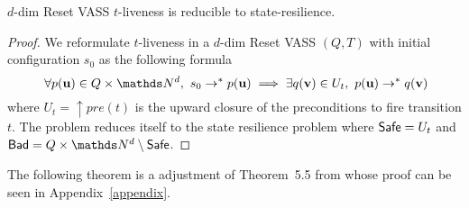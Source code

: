 \iffalse
\alain{ou alors $t=(u,u')$ such that $u \rightarrow u'$ mais alors c'est bizarre de nommer par la même lettre $t$ des couples différents $(u,u'), (v,v'),...$ dans un WSTS...ou alors on appelle transition un couple $(u,u')$ such that $u \rightarrow u'$ mais plus de lettre $t$...ou on définit un WSTS par un nombre fini de (shéma de ) transition $t_i$ qui sont compatibles par compatibilité mais ça contraint à un nombre fini (comme dans les VASS) ou alors on ne parle ici que des VASS et pas des WSTS mais ça suffira puisque state resilience pour VASS implique pour WSTS BREF il faut réfléchir à ce qu'est une transition...}

\mathieu{En train de penser que le mieux serait de définir la $t$-liveness pas pour les WSTS mais pour les (Reset) VASS uniquement et ensuite dire SRP indécidable dans WSTS car indécidable pour les Reset VASS.}

\fi


\begin{proposition}\label{reductions}
{\sc $d$-dim Reset VASS $t$-liveness} is reducible to {\sc state-resilience}.
\end{proposition}


\begin{proof}
We reformulate $t$-liveness 
in a 
$d$-dim Reset VASS $(Q,T)$ 
with initial configuration $s_0$
as the following formula
$$ ~ \forall p(\textbf{u}) \in Q \times \N^d, 
~ s_0 \rightarrow^* p(\textbf{u}) \implies \exists q(\textbf{v}) \in U_t, ~ p(\textbf{u}) \rightarrow^{*} q(\textbf{v})$$  
where
$U_t=\uparrow pre(t)$ 
is the upward closure of the preconditions to fire transition $t$.  
The problem reduces itself to the state resilience problem
where $\textsf{Safe} = U_t$ and $\Bad = Q \times \N^d \setminus \Safe$.
\end{proof}

The following theorem is a adjustment of Theorem~5.5 from \cite{peterson1981petri} whose proof can be seen in Appendix~\ref{appendix}.



